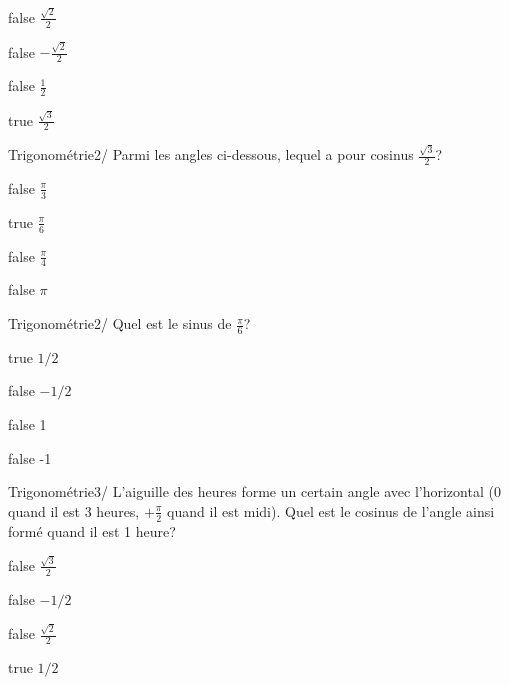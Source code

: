 \documentclass[11pt]{article}
\begin{document}
            \begin{reponses}
                \item[false] $\frac{\sqrt{2}}{2}$
                \item[false] $-\frac{\sqrt{2}}{2}$
                \item[false] $\frac{1}{2}$
                \item[true] $\frac{\sqrt{3}}{2}$
            \end{reponses}
    
            \begin{question}{31}{Trigonométrie}{2}{/}
				Parmi les angles ci-dessous, lequel a pour cosinus $\frac{\sqrt{3}}{2}$?
            \end{question}

            \begin{reponses}
            	\item[false] $\frac{\pi}{3}$
            	\item[true] $\frac{\pi}{6}$
                \item[false] $\frac{\pi}{4}$
                \item[false] $\pi$
            \end{reponses}

            \begin{question}{31}{Trigonométrie}{2}{/}
            	Quel est le sinus de $\frac{\pi}{6}$? 
            \end{question}

            \begin{reponses}
                \item[true] $1/2$
                \item[false] $-1/2$
                \item[false] 1
                \item[false] -1
            \end{reponses}
        
        	\begin{question}{31}{Trigonométrie}{3}{/}
				L'aiguille des heures forme un certain angle avec l'horizontal (0 quand il est 3 heures, $+\frac{\pi}{2}$ quand il est midi). Quel est le cosinus de l'angle ainsi formé quand il est 1 heure? 
            \end{question}

            \begin{reponses}
            	\item[false] $\frac{\sqrt{3}}{2}$
            	\item[false] $-1/2$
                \item[false] $\frac{\sqrt{2}}{2}$
                \item[true] $1/2$
            \end{reponses}
        
\end{document}
